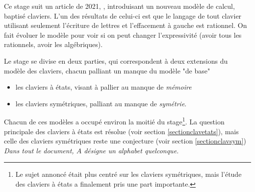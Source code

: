 \documentclass[12pt, a4paper]{article}
\begin{document}
    Ce stage suit un article de 2021, \cite{bible}, introduisant un nouveau modèle de calcul,
    baptisé claviers. L’un des résultats de celui-ci est que le langage de tout clavier
    utilisant seulement l’écriture de lettres et l’effacement à gauche est rationnel. On fait évoluer le modèle pour voir si on peut changer l'expressivité (avoir tous les rationnels, avoir les algébriques).
    
    Le stage se divise en deux parties, qui correspondent à deux extensions du modèle des claviers, chacun palliant un manque du modèle "de base"
    \begin{itemize}
        \item les claviers à états, visant à pallier au manque de \emph{mémoire}
        \item les claviers symétriques, palliant au manque de \emph{symétrie}.
    \end{itemize}
    Chacun de ces modèles a occupé environ la moitié du stage\footnote{Le sujet annoncé était plus centré sur les claviers symétriques, mais l'étude des claviers à états a finalement pris une part importante.}. 
    La question principale des claviers à états est résolue (voir section \ref{sectionclavetats}), mais celle des claviers symétriques reste une conjecture (voir section \ref{sectionclavsym})
    \clearpage    
    \emph{Dans tout le document, $A$ désigne un alphabet quelconque.}
\end{document}
